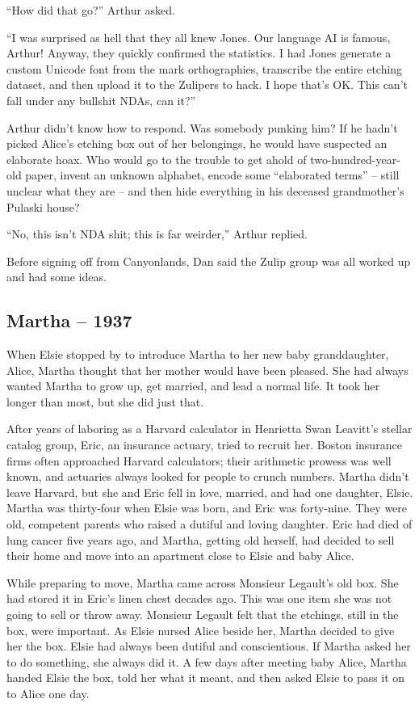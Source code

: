 ``How did that go?'' Arthur asked.

``I was surprised as hell that they all knew Jones. Our language AI is
famous, Arthur! Anyway, they quickly confirmed the statistics. I had
Jones generate a custom Unicode font from the mark orthographies,
transcribe the entire etching dataset, and then upload it to the
Zulipers to hack. I hope that's OK. This can't fall under any bullshit
NDAs, can it?''

Arthur didn't know how to respond. Was somebody punking him? If he
hadn't picked Alice's etching box out of her belongings, he would have
suspected an elaborate hoax. Who would go to the trouble to get ahold of
two-hundred-year-old paper, invent an unknown alphabet, encode some
``elaborated terms'' -- still unclear what they are -- and then hide
everything in his deceased grandmother's Pulaski house?

``No, this isn't NDA shit; this is far weirder,'' Arthur replied.

Before signing off from Canyonlands, Dan said the Zulip group was all
worked up and had some ideas.

\hypertarget{martha-1937}{%
\subsection*{Martha -- 1937}\label{martha-1937}}

When Elsie stopped by to introduce Martha to her new baby granddaughter,
Alice, Martha thought that her mother would have been pleased. She had
always wanted Martha to grow up, get married, and lead a normal life. It
took her longer than most, but she did just that.

After years of laboring as a Harvard calculator in Henrietta Swan
Leavitt's stellar catalog group, Eric, an insurance actuary, tried to
recruit her. Boston insurance firms often approached Harvard
calculators; their arithmetic prowess was well known, and actuaries
always looked for people to crunch numbers. Martha didn't leave Harvard,
but she and Eric fell in love, married, and had one daughter, Elsie.
Martha was thirty-four when Elsie was born, and Eric was forty-nine.
They were old, competent parents who raised a dutiful and loving
daughter. Eric had died of lung cancer five years ago, and Martha,
getting old herself, had decided to sell their home and move into an
apartment close to Elsie and baby Alice.

While preparing to move, Martha came across Monsieur Legault's old box.
She had stored it in Eric's linen chest decades ago. This was one item
she was not going to sell or throw away. Monsieur Legault felt that the
etchings, still in the box, were important. As Elsie nursed Alice beside
her, Martha decided to give her the box. Elsie had always been dutiful
and conscientious. If Martha asked her to do something, she always did
it. A few days after meeting baby Alice, Martha handed Elsie the box,
told her what it meant, and then asked Elsie to pass it on to Alice one
day.

